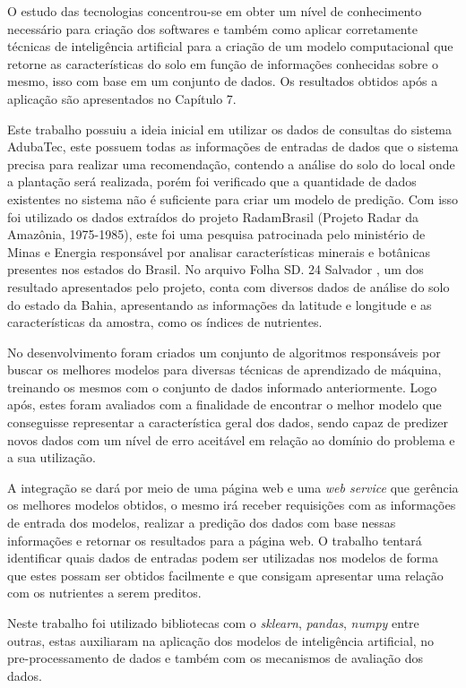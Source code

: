 \documentclass[
12pt,				%
oneside,			%
a4paper,			%
english,			%
french,				%
spanish,			%
brazil				%
]{abntex2}
\begin{document}
O estudo das tecnologias concentrou-se em obter um nível de conhecimento necessário para criação dos softwares e também como aplicar corretamente técnicas de inteligência artificial para a criação de um modelo computacional que retorne as características do solo em função de informações conhecidas sobre o mesmo, isso com base em um conjunto de dados. Os resultados obtidos após a aplicação são apresentados no Capítulo 7.

Este trabalho possuiu a ideia inicial em utilizar os dados de consultas do sistema AdubaTec, este possuem todas as informações de entradas de dados que o sistema precisa para realizar uma recomendação, contendo a análise do solo do local onde a plantação será realizada, porém foi verificado que a quantidade de dados existentes no sistema não é suficiente para criar um modelo de predição. Com isso foi utilizado os dados extraídos do projeto RadamBrasil (Projeto Radar da Amazônia, 1975-1985), este foi uma pesquisa patrocinada pelo ministério de Minas e Energia responsável por analisar características minerais e botânicas presentes nos estados do Brasil. No arquivo Folha SD. 24 Salvador \cite{limaprojeto}, um dos resultado apresentados pelo projeto, conta com diversos dados de análise do solo do estado da Bahia, apresentando as informações da latitude e longitude e as características da amostra, como os índices de nutrientes.    

No desenvolvimento foram criados um conjunto de algoritmos responsáveis por buscar os melhores modelos para diversas técnicas de aprendizado de máquina, treinando os mesmos com o conjunto de dados informado anteriormente. Logo após, estes foram avaliados com a finalidade de encontrar o melhor modelo que conseguisse representar a característica geral dos dados, sendo capaz de predizer novos dados com um nível de erro aceitável em relação ao domínio do problema e a sua utilização. 

A integração se dará por meio de uma página web e uma \textit{web service} que gerência os melhores modelos obtidos, o mesmo irá receber requisições com as informações de entrada dos modelos, realizar a predição dos dados com base nessas informações e retornar os resultados para a página web. O trabalho tentará identificar quais dados de entradas podem ser utilizadas nos modelos de forma que estes possam ser obtidos facilmente e que consigam apresentar uma relação com os nutrientes a serem preditos.

Neste trabalho foi utilizado bibliotecas com o \textit{sklearn}, \textit{pandas}, \textit{numpy} entre outras, estas auxiliaram na aplicação dos modelos de inteligência artificial, no pre-processamento de dados e também com os mecanismos de avaliação dos dados.  
\end{document}
